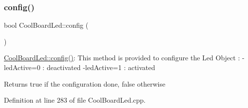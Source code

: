 \subsubsection{\texorpdfstring{config()}{config()}}
{\footnotesize\ttfamily bool Cool\+Board\+Led\+::config (\begin{DoxyParamCaption}{ }\end{DoxyParamCaption})}

\hyperlink{class_cool_board_led_a1b60e5e30bea96c49ed62ed1bf1ffc8b}{Cool\+Board\+Led\+::config()}\+: This method is provided to configure the Led Object \+: -\/led\+Active=0 \+: deactivated -\/led\+Active=1 \+: activated \begin{DoxyReturn}{Returns}
true if the configuration done, false otherwise 
\end{DoxyReturn}


Definition at line 283 of file Cool\+Board\+Led.\+cpp.


